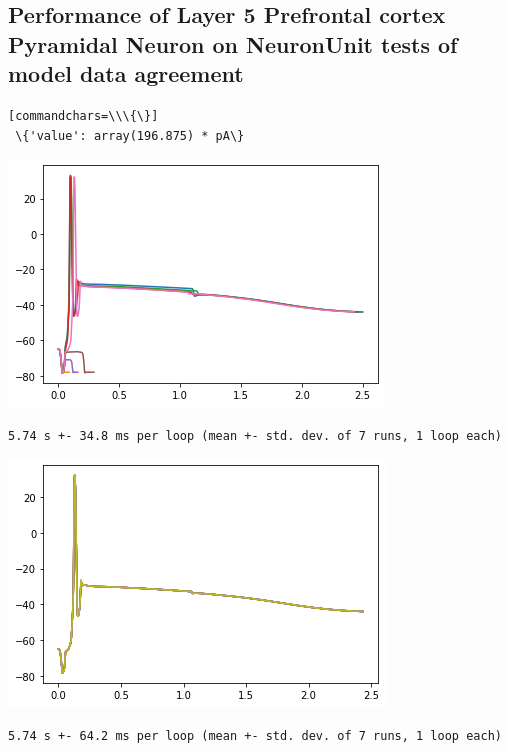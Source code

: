 
    
\subsection{Performance of Layer 5 Prefrontal cortex Pyramidal Neuron on
NeuronUnit tests of model data
agreement}

    \begin{verbatim}[commandchars=\\\{\}]
 \{'value': array(196.875) * pA\}
    \end{verbatim}

    \begin{center}
    \includegraphics[width=0.7\linewidth]{figures/NU_BBP_fusion_L5PC_files/NU_BBP_fusion_L5PC_3_1.png}
    \end{center}

    \begin{verbatim}
5.74 s +- 34.8 ms per loop (mean +- std. dev. of 7 runs, 1 loop each)
    \end{verbatim}

    \begin{center}
    \includegraphics[width=0.7\linewidth]{figures/NU_BBP_fusion_L5PC_files/NU_BBP_fusion_L5PC_4_1.png}
    \end{center}

    \begin{verbatim}
5.74 s +- 64.2 ms per loop (mean +- std. dev. of 7 runs, 1 loop each)
    \end{verbatim}

